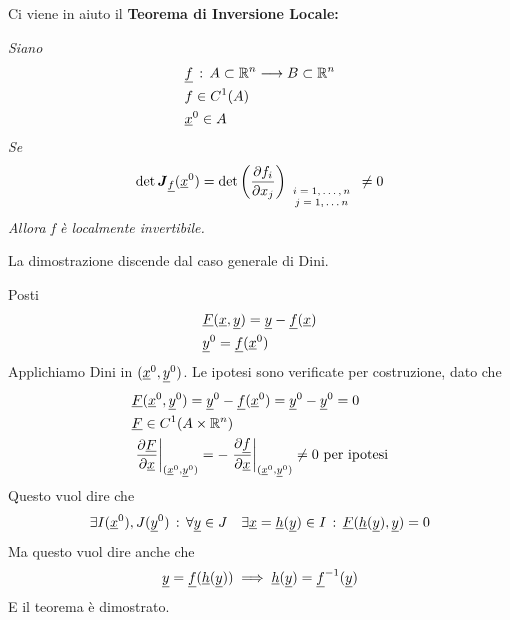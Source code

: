 Ci viene in aiuto il \textbf{Teorema di Inversione Locale:}

\bigskip

\textit{Siano}
\begin{align}
	{}&\underline{f} \, : \, A \subset \mathbb{R}^n \longrightarrow B \subset \mathbb{R}^n\\
	&f\in C^1(A)\\
	&\underline{x}^0 \in A
\end{align}
\textit{Se}
\begin{align}
	\det \boldsymbol{J}_{\underline{f}} (\underline{x}^0) = \det\left( \frac{\partial f_i}{\partial x_j} \right)_{\scriptsize{
			\begin{array}{cc}
				i=1,\dots,n\\
				j=1,\dots n
			\end{array}
	}} \neq 0
\end{align}
\textit{Allora f è localmente invertibile.}

\bigskip

La dimostrazione discende dal caso generale di Dini. 

Posti
\begin{align}
	{}&\underline{F} (\underline{x},\underline{y})= \underline{y} - \underline{f}(\underline{x})\\
	& \underline{y}^0 = \underline{f}(\underline{x}^0)
\end{align}
Applichiamo Dini in $(\underline{x}^0,\underline{y}^0)$. Le ipotesi sono verificate per costruzione, dato che
\begin{align}
	{}&\underline{F} (\underline{x}^0,\underline{y}^0)= \underline{y}^0 - \underline{f}(\underline{x}^0) = \underline{y}^0 - \underline{y}^0 =0\\
	&\underline{F}\in C^1(A \times \mathbb{R}^n)\\
	& \left. \frac{\partial \underline{F}}{\partial \underline{x}} \right|_{(\underline{x}^0,\underline{y}^0)} = - \left. \frac{\partial \underline{f}}{\partial \underline{x}} \right|_{(\underline{x}^0,\underline{y}^0)} \neq 0 \text{ per ipotesi}
\end{align}
Questo vuol dire che
\begin{align}
	\exists I(\underline{x}^0),J(\underline{y}^0) \, : \, \forall \underline{y} \in J \quad \exists \underline{x} = \underline{h}(\underline{y}) \in I \, : \, \underline{F} (\underline{h}(\underline{y}),\underline{y}) =0
\end{align}
Ma questo vuol dire anche che
\begin{align}
	\underline{y} = \underline{f}(\underline{h}(\underline{y})) \implies \underline{h}(\underline{y})= \underline{f}^{-1}(\underline{y})
\end{align}
E il teorema è dimostrato.

\bigskip

